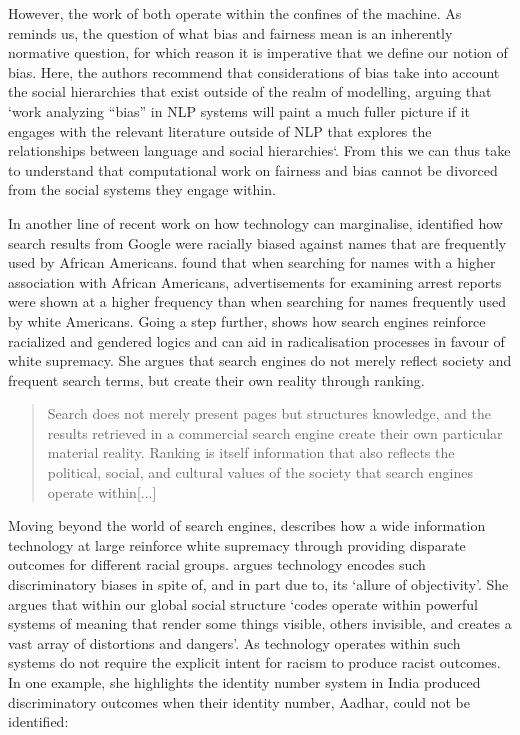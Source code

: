 However, the work of \cite{Kearns:2018,Foulds:2019} both operate within the confines of the machine. As \cite{Blodgett:2020} reminds us, the question of what bias and fairness mean is an inherently normative question, for which reason it is imperative that we define our notion of bias. Here, the authors recommend that considerations of bias take into account the social hierarchies that exist outside of the realm of modelling, arguing that `work analyzing ``bias'' in NLP systems will paint a much fuller picture if it engages with the relevant literature outside of NLP that explores the relationships between language and social hierarchies`. From this we can thus take to understand that computational work on fairness and bias cannot be divorced from the social systems they engage within.

In another line of recent work on how technology can marginalise, \cite{Sweeney:2013} identified how search results from Google were racially biased against names that are frequently used by African Americans. \cite{Sweeney:2013} found that when searching for names with a higher association with African Americans, advertisements for examining arrest reports were shown at a higher frequency than when searching for names frequently used by white Americans. Going a step further, \cite{Noble:2018} shows how search engines reinforce racialized and gendered logics and can aid in radicalisation processes in favour of white supremacy. She argues that search engines do not merely reflect society and frequent search terms, but create their own reality through ranking.

\begin{quote}{\cite[p.148]{Noble:2018}}
  Search does not merely present pages but structures knowledge, and the results retrieved in a commercial search engine create their own particular material reality. Ranking is itself information that also reflects the political, social, and cultural values of the society that search engines operate within[...]
\end{quote}

Moving beyond the world of search engines, \cite{Benjamin:2019} describes how a wide information technology at large reinforce white supremacy through providing disparate outcomes for different racial groups. \cite{Benjamin:2019} argues technology encodes such discriminatory biases in spite of, and in part due to, its `allure of objectivity'. She argues that within our global social structure `codes operate within powerful systems of meaning that render some things visible, others invisible, and creates a vast array of distortions and dangers'. As technology operates within such systems do not require the explicit intent for racism to produce racist outcomes. In one example, she highlights the identity number system in India produced discriminatory outcomes when their identity number, Aadhar, could not be identified:

